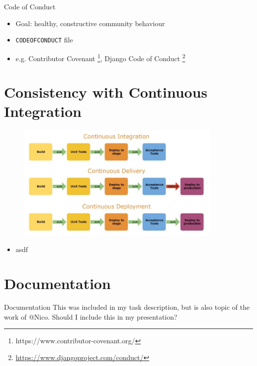 \documentclass[compress,aspectratio=169]{beamer}
\begin{document}
		\begin{frame}{Code of Conduct}
			\begin{itemize}
				\item Goal: healthy, constructive community behaviour
				\item \texttt{CODE\textunderscore OF\textunderscore CONDUCT} file
				\item e.g. Contributor Covenant \footnote{https://www.contributor-covenant.org/}, Django Code of Conduct \footnote{\url{https://www.djangoproject.com/conduct/}}
			\end{itemize}				
		\end{frame}
	
	\section{Consistency with Continuous Integration}	
		\begin{frame}
			\begin{figure}
			\includegraphics[width=10cm]{assets/ci-overview.png}
			\end{figure}
		
		\end{frame}
		
		\begin{frame}
			\begin{itemize}
				\item asdf
			\end{itemize}
		\end{frame}
		
	\section{Documentation}
		\begin{frame}{Documentation}
			This was included in my task description, but is also topic of the work of @Nico. Should I include this in my presentation?
		
		\end{frame}
	
\end{document}

